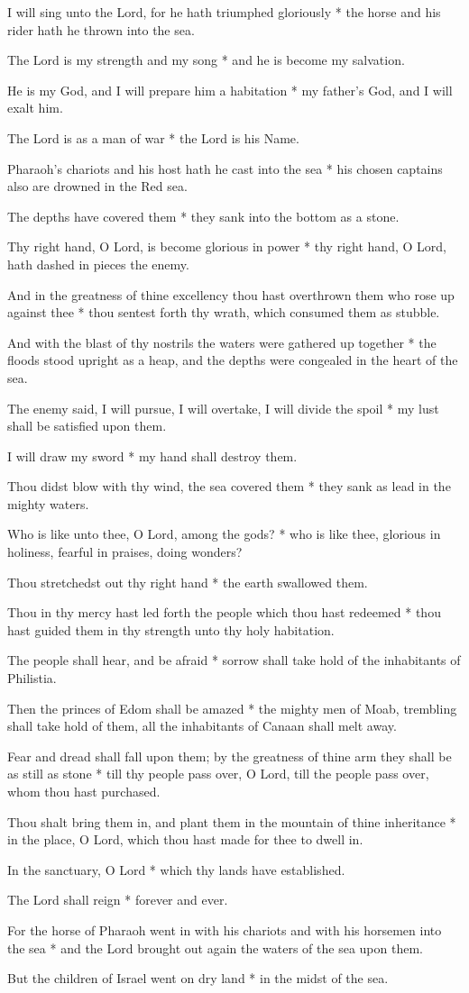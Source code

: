 I will sing unto the Lord, for he hath triumphed gloriously * the horse and his rider hath he thrown into the sea.

The Lord is my strength and my song * and he is become my salvation.

He is my God, and I will prepare him a habitation * my father's God, and I will exalt him.

The Lord is as a man of war * the Lord is his Name.

Pharaoh's chariots and his host hath he cast into the sea * his chosen captains also are drowned in the Red sea.

The depths have covered them * they sank into the bottom as a stone.

Thy right hand, O Lord, is become glorious in power * thy right hand, O Lord, hath dashed in pieces the enemy.

And in the greatness of thine excellency thou hast overthrown them who rose up against thee * thou sentest forth thy wrath, which consumed them as stubble.

And with the blast of thy nostrils the waters were gathered up together * the floods stood upright as a heap, and the depths were congealed in the heart of the sea.

The enemy said, I will pursue, I will overtake, I will divide the spoil * my lust shall be satisfied upon them.

I will draw my sword * my hand shall destroy them.

Thou didst blow with thy wind, the sea covered them * they sank as lead in the mighty waters.

Who is like unto thee, O Lord, among the gods? * who is like thee, glorious in holiness, fearful in praises, doing wonders?

Thou stretchedst out thy right hand * the earth swallowed them.

Thou in thy mercy hast led forth the people which thou hast redeemed * thou hast guided them in thy strength unto thy holy habitation.

The people shall hear, and be afraid * sorrow shall take hold of the inhabitants of Philistia.

Then the princes of Edom shall be amazed * the mighty men of Moab, trembling shall take hold of them, all the inhabitants of Canaan shall melt away.

Fear and dread shall fall upon them; by the greatness of thine arm they shall be as still as stone * till thy people pass over, O Lord, till the people pass over, whom thou hast purchased.

Thou shalt bring them in, and plant them in the mountain of thine inheritance * in the place, O Lord, which thou hast made for thee to dwell in.

In the sanctuary, O Lord * which thy lands have established.

The Lord shall reign * forever and ever.

For the horse of Pharaoh went in with his chariots and with his horsemen into the sea * and the Lord brought out again the waters of the sea upon them.

But the children of Israel went on dry land * in the midst of the sea.
